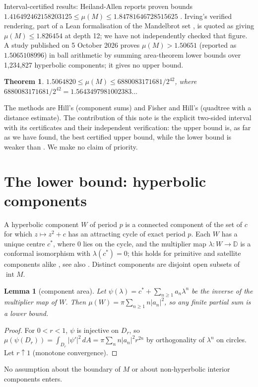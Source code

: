 \documentclass[11pt]{article}
\newtheorem{lemma}{Lemma}
\newtheorem{theorem}{Theorem}
\begin{document}
Interval-certified results: Heiland-Allen reports proven bounds $1.416492462158203125\le\mu(M)\le1.84781646728515625$ \cite{heilandallen2023}. Irving's verified rendering, part of a Lean formalisation of the Mandelbrot set \cite{irving_ray,irving_render}, is quoted as giving $\mu(M)\le1.826454$ at depth 12; we have not independently checked that figure. A study published on 5 October 2026 \cite{sciencejournal2026} proves $\mu(M)>1.50651$ (reported as $1.5065108996$) in ball arithmetic by summing area-theorem lower bounds over 1,234,827 hyperbolic components; it gives no upper bound.

\begin{theorem}\label{thm:main}
$1.5064820\le\mu(M)\le 6880083171681/2^{42}$, where $6880083171681/2^{42}=1.5643497981002383\ldots$
\end{theorem}

The methods are Hill's (component sums) and Fisher and Hill's (quadtree with a distance estimate). The contribution of this note is the explicit two-sided interval with its certificates and their independent verification: the upper bound is, as far as we have found, the best certified upper bound, while the lower bound is weaker than \cite{sciencejournal2026}. We make no claim of priority.

\section{The lower bound: hyperbolic components}

A hyperbolic component $W$ of period $p$ is a connected component of the set of $c$ for which $z\mapsto z^2+c$ has an attracting cycle of exact period $p$. Each $W$ has a unique centre $c^*$, where $0$ lies on the cycle, and the multiplier map $\lambda:W\to\mathbb{D}$ is a conformal isomorphism with $\lambda(c^*)=0$; this holds for primitive and satellite components alike \cite[Thm.~6.5]{milnor2000}, see also \cite{douadyhubbard}. Distinct components are disjoint open subsets of $\operatorname{int}M$.

\begin{lemma}[component area]\label{lem:area}
Let $\psi(\lambda)=c^*+\sum_{n\ge1}a_n\lambda^n$ be the inverse of the multiplier map of $W$. Then $\mu(W)=\pi\sum_{n\ge1}n|a_n|^2$, so any finite partial sum is a lower bound.
\end{lemma}
\begin{proof}
For $0<r<1$, $\psi$ is injective on $D_r$, so $\mu(\psi(D_r))=\int_{D_r}|\psi'|^2\,dA=\pi\sum_n n|a_n|^2r^{2n}$ by orthogonality of $\lambda^n$ on circles. Let $r\uparrow1$ (monotone convergence).
\end{proof}
No assumption about the boundary of $M$ or about non-hyperbolic interior components enters.
\end{document}
